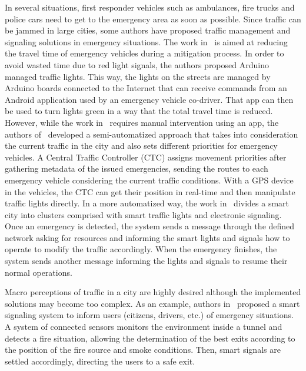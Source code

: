 \begin{refsection}
In several situations, first responder vehicles such as ambulances, fire trucks and police cars need to get to the emergency area as soon as possible. Since traffic can be jammed in large cities, some authors have proposed traffic management and signaling solutions in emergency situations. The work in~\cite{mitigationurban4} is aimed at reducing the travel time of emergency vehicles during a mitigation process. In order to avoid wasted time due to red light signals, the authors proposed Arduino managed traffic lights. This way, the lights on the streets are managed by Arduino boards connected to the Internet that can receive commands from an Android application used by an emergency vehicle co-driver. That app can then be used to turn lights green in a way that the total travel time is reduced. However, while the work in~\cite{mitigationurban4} requires manual intervention using an app, the authors of~\cite{mitigationurban5} developed a semi-automatized approach that takes into consideration the current traffic in the city and also sets different priorities for emergency vehicles. A Central Traffic Controller (CTC) assigns movement priorities after gathering metadata of the issued emergencies, sending the routes to each emergency vehicle considering the current traffic conditions. With a GPS device in the vehicles, the CTC can get their position in real-time and then manipulate traffic lights directly. In a more automatized way, the work in~\cite{rego2018software} divides a smart city into clusters comprised with smart traffic lights and electronic signaling. Once an emergency is detected, the system sends a message through the defined network asking for resources and informing the smart lights and signals how to operate to modify the traffic accordingly. When the emergency finishes, the system sends another message informing the lights and signals to resume their normal operations. 

Macro perceptions of traffic in a city are highly desired although the implemented solutions may become too complex. As an example, authors in~\cite{s150614370} proposed a smart signaling system to inform users (citizens, drivers, etc.) of emergency situations. A system of connected sensors monitors the environment inside a tunnel and detects a fire situation, allowing the determination of the best exits according to the position of the fire source and smoke conditions. Then, smart signals are settled accordingly, directing the users to a safe exit.


\end{refsection}
